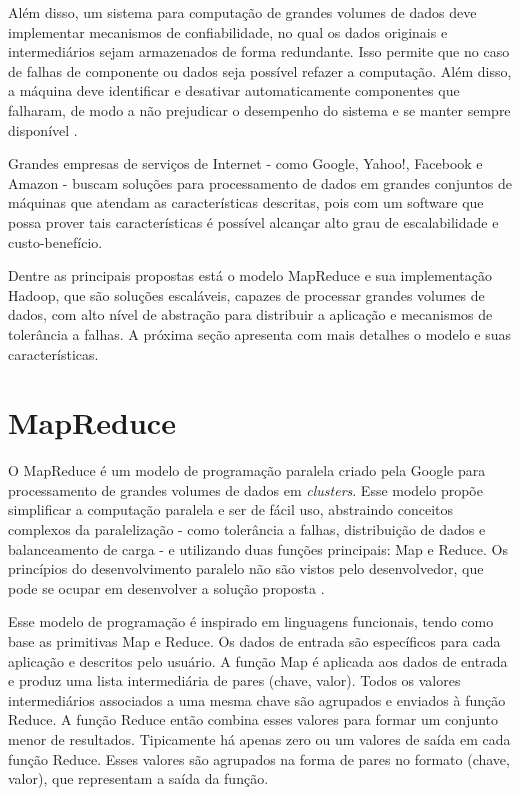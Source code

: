 
Além disso, um sistema para computação de grandes volumes de dados deve implementar mecanismos de confiabilidade, no qual os dados originais e intermediários sejam armazenados de forma redundante. Isso permite que no caso de falhas de componente ou dados seja possível refazer a computação. Além disso, a máquina deve identificar e desativar automaticamente componentes que falharam, de modo a não prejudicar o desempenho do sistema e se manter sempre disponível \cite{Bryant:2011}.

Grandes empresas de serviços de Internet - como Google, Yahoo!, Facebook e Amazon - buscam soluções para processamento de dados em grandes conjuntos de máquinas que atendam as características descritas, pois com um software que possa prover tais características é possível alcançar alto grau de escalabilidade e custo-benefício. 

Dentre as principais propostas está o modelo MapReduce e sua implementação Hadoop, que são soluções escaláveis, capazes de processar grandes volumes de dados, com alto nível de abstração para distribuir a aplicação e mecanismos de tolerância a falhas.
A próxima seção apresenta com mais detalhes o modelo e suas características.

\section{MapReduce}
O MapReduce é um modelo de programação paralela criado pela Google para processamento de grandes volumes de dados em \textit{clusters}. Esse modelo propõe simplificar a computação paralela e ser de fácil uso, abstraindo conceitos complexos da paralelização - como tolerância a falhas, distribuição de dados e balanceamento de carga - e utilizando duas funções principais: Map e Reduce. Os princípios do desenvolvimento paralelo não são vistos pelo desenvolvedor, que pode se ocupar em desenvolver a solução proposta \cite{Dean:2008}.

Esse modelo de programação é inspirado em linguagens funcionais, tendo como base as primitivas Map e Reduce.
Os dados de entrada são específicos para cada aplicação e descritos pelo usuário.
A função Map é aplicada aos dados de entrada e produz uma lista intermediária de pares (chave, valor). Todos os valores intermediários associados a uma mesma chave são agrupados e enviados à função Reduce.
A função Reduce então
combina esses valores para formar um conjunto menor de resultados.
Tipicamente há apenas zero ou um valores de saída em cada função Reduce. Esses valores são agrupados na forma de pares no formato (chave, valor), que representam a saída da função.


